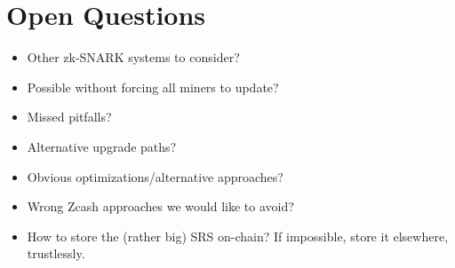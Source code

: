 \section{Open Questions}
  \begin{itemize}
    \item Other zk-SNARK systems to consider?
    \item Possible without forcing all miners to update?
    \item Missed pitfalls?
    \item Alternative upgrade paths?
    \item Obvious optimizations/alternative approaches?
    \item Wrong Zcash approaches we would like to avoid?
    \item How to store the (rather big) SRS on-chain? If impossible, store it
    elsewhere, trustlessly.
  \end{itemize}
